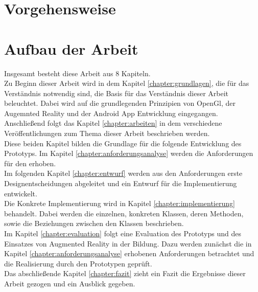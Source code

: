 \section{Vorgehensweise}

\section{Aufbau der Arbeit}
Insgesamt besteht diese Arbeit aus 8 Kapiteln.\\
Zu Beginn dieser Arbeit wird in dem Kapitel \ref{chapter:grundlagen}, die für das Verständnis notwendig sind, die Basis für das Verständnis dieser Arbeit beleuchtet. Dabei wird auf die grundlegenden Prinzipien von OpenGl, der Augemnted Reality und der Android App Entwicklung eingegangen.\\
Anschließend folgt das Kapitel \ref{chapter:arbeiten} in dem verschiedene Veröffentlichungen zum Thema dieser Arbeit beschrieben werden.\\
Diese beiden Kapitel bilden die Grundlage für die folgende Entwicklung des Prototyps. Im Kapitel \ref{chapter:anforderungsanalyse} werden die Anforderungen für den erhoben.\\
Im folgenden Kapitel \ref{chapter:entwurf} werden aus den Anforderungen erste Designentscheidungen abgeleitet und ein Entwurf für die Implementierung entwickelt.\\
Die Konkrete Implementierung wird in Kapitel \ref{chapter:implementierung} behandelt. Dabei werden die einzelnen, konkreten Klassen, deren Methoden, sowie die Beziehungen zwischen den Klassen beschrieben. \\
Im Kapitel \ref{chapter:evaluation} folgt eine Evaluation des Prototyps und des Einsatzes von Augmented Reality in der Bildung. Dazu werden zunächst die in Kapitel \ref{chapter:anforderungsanalyse} erhobenen Anforderungen betrachtet und die Realisierung durch den Prototypen geprüft. \\
Das abschließende Kapitel \ref{chapter:fazit} zieht ein Fazit die Ergebnisse dieser Arbeit gezogen und ein Ausblick gegeben. 

